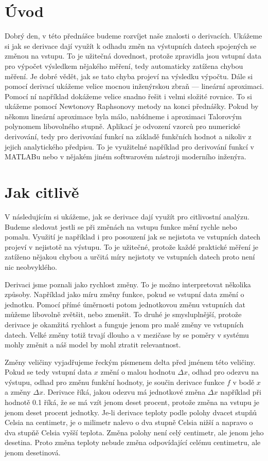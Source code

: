 \documentclass[12pt]{article}
\begin{document}
\section*{Úvod}

Dobrý den, v této přednášce budeme rozvíjet naše znalosti o derivacích. Ukážeme si jak se derivace dají využít k odhadu změn na výstupních datech spojených se změnou na vstupu. To je užitečná dovednost, protože zpravidla jsou vstupní data pro výpočet výsledkem nějakého měření, tedy automaticky zatížena chybou měření. Je dobré vědět, jak se tato chyba projeví na výsledku výpočtu. Dále si pomocí derivací ukážeme velice mocnou inženýrskou zbraň --- lineární aproximaci. Pomocí ní například dokážeme velice snadno řešit i velmi složité rovnice. To si ukážeme pomocí Newtonovy Raphsonovy metody na konci přednášky. Pokud by někomu lineární aproximace byla málo, nabídneme i aproximaci Talorovým polynomem libovolného stupně. Aplikací je odvození vzorců pro numerické derivování, tedy pro derivování funkcí na základě funkčních hodnot a nikoliv z jejich analytického předpisu. To je využitelné například pro derivování funkcí v MATLABu nebo v nějakém jiném softwarovém nástroji moderního inženýra. 

\section*{Jak citlivě}

V následujícím si ukážeme, jak se derivace dají využít pro citlivostní analýzu. Budeme sledovat jestli se při změnách na vstupu funkce mění rychle nebo pomalu. Využití je například i pro posouzení jak se nejistota ve vstupních datech projeví v nejistotě na výstupu. To je užitečné, protože každé praktické měření je zatíženo nějakou chybou a určitá míry nejistoty ve vstupních datech proto není nic neobvyklého.

Derivaci jsme poznali jako rychlost změny. To je možno interpretovat několika způsoby. Například jako míru změny funkce, pokud se vstupní data změní o jednotku. Pomocí přímé úměrnosti potom jednotkovou změnu vstupních dat můžeme libovolně zvětšit, nebo zmenšit. To druhé je smysluplnější, protože derivace je okamžitá rychlost a funguje jenom pro malé změny ve vstupních datech. Velké změny totiž trvají dlouho a v mezičase by se poměry v systému mohly změnit a náš model by mohl ztratit relevantnost. 

Změny veličiny vyjadřujeme řeckým písmenem delta před jménem této veličiny. 
Pokud se tedy vstupní data $x$ změní o malou hodnotu $\Delta x$, odhad pro odezvu na výstupu, odhad pro změnu funkční hodnoty, je součin derivace funkce $f$ v bodě $x$ a změny $\Delta x$. Derivace říká, jakou odezvu má jednotkové změna $\Delta x$ například při hodnotě 0.1 říká, že se má vzít jenom deset procent, protože změna na vstupu je jenom deset procent jednotky. Je-li derivace teploty podle polohy dvacet stupňů Celsia na centimetr, je o milimetr nalevo o dva stupně Celsia nižší a napravo o dva stupňě Celsia vyšší teplota. Změna polohy není celý centimetr, ale jenom jeho desetina. Proto změna teploty nebude změna odpovídající celému centimetru, ale jenom desetinová.
\end{document}
